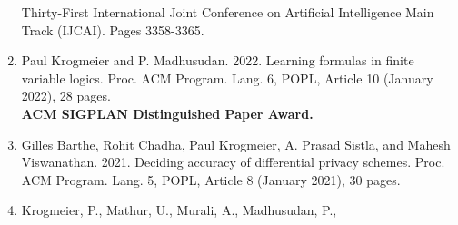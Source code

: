 \documentclass[sigchi,12pt,a4paper,sans,nonacm]{acmart}
\newcommand{\myh}[3][zgreen]{\href{#2}{\color{#1}{#3}}}
\begin{document}
\begin{enumerate}[itemsep=16pt]
  Thirty-First International Joint Conference on Artificial
  Intelligence Main Track (IJCAI). Pages
  3358-3365.\\ \myh{https://doi.org/10.24963/ijcai.2022/466}{https://doi.org/10.24963/ijcai.2022/466}
\item[] Paul Krogmeier and P. Madhusudan. 2022. Learning formulas in
  finite variable logics. Proc. ACM Program. Lang. 6, POPL, Article 10
  (January 2022), 28
  pages. \myh{https://doi.org/10.1145/3498671}{https://doi.org/10.1145/3498671}
  \\ \textbf{ACM SIGPLAN Distinguished Paper Award.}
\item[] Gilles Barthe, Rohit Chadha, Paul Krogmeier, A. Prasad Sistla,
  and Mahesh Viswanathan. 2021. Deciding accuracy of differential
  privacy schemes. Proc. ACM Program. Lang. 5, POPL, Article 8
  (January 2021), 30 pages. \myh{https://doi.org/10.1145/3434289}{https://doi.org/10.1145/3434289}
\item[] Krogmeier, P., Mathur, U., Murali, A., Madhusudan, P.,

\end{enumerate}
\end{document}
